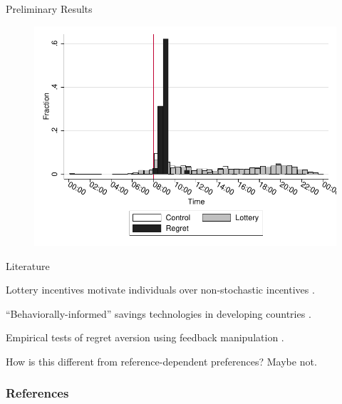 \documentclass[aspectratio=169]{beamer}
\newenvironment{wideenumerate}{\enumerate\addtolength{\itemsep}{10pt}}{\endenumerate}
\begin{document}
\begin{frame}{Preliminary Results}

	\begin{figure}[H]
		\centering
		\includegraphics[width=0.65\linewidth]{hist-deposits.pdf}
	\end{figure}

\end{frame}

\begin{frame}{Literature}

	\begin{wideenumerate}

		\item Lottery incentives motivate individuals over non-stochastic incentives \parencite{herskowitz_gambling_2016,atalay_savings_2014,filiz-ozbay_lottery_2015,cookson_when_2016,dizon_leveraging_2016}.
		\item ``Behaviorally-informed'' savings technologies in developing countries \parencite{akbas_how_2016,karlan_getting_2010,thaler_save_2004,ashraf_tying_2006,dupas_why_2013}. 
		\item Empirical tests of regret aversion using feedback manipulation \parencite{zeelenberg_consequences_1996,zeelenberg_consequences_2004,filiz-ozbay_auctions_2007}.
		\item How is this different from reference-dependent preferences? Maybe not.

	\end{wideenumerate}

\end{frame}

\begin{frame}[allowframebreaks] \frametitle{References}

	\printbibliography

\end{frame}
\end{document}

